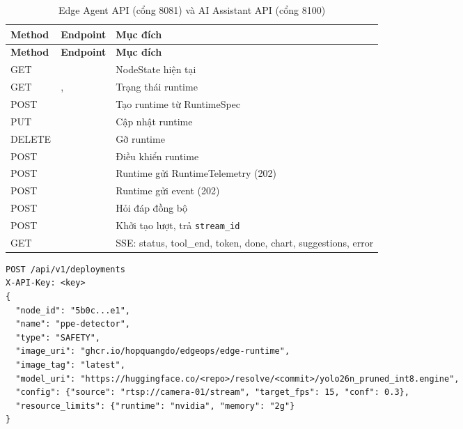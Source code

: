 \begin{longtable}{L{1.7cm}L{6.2cm}L{6.6cm}}
\caption{Edge Agent API (cổng 8081) và AI Assistant API (cổng 8100)}\label{tab:agent-api}\\
\toprule
\textbf{Method} & \textbf{Endpoint} & \textbf{Mục đích}\\
\midrule\endfirsthead
\toprule
\textbf{Method} & \textbf{Endpoint} & \textbf{Mục đích}\\
\midrule\endhead
GET &  & NodeState hiện tại\\
GET & ,  & Trạng thái runtime\\
POST &  & Tạo runtime từ RuntimeSpec\\
PUT &  & Cập nhật runtime\\
DELETE &  & Gỡ runtime\\
POST &  & Điều khiển runtime\\
POST &  & Runtime gửi RuntimeTelemetry (202)\\
POST &  & Runtime gửi event (202)\\
\midrule
POST &  & Hỏi đáp đồng bộ\\
POST &  & Khởi tạo lượt, trả \texttt{stream\_id}\\
GET &  & SSE: status, tool\_end, token, done, chart, suggestions, error\\
\bottomrule
\end{longtable}

\begin{lstlisting}[caption={Ví dụ yêu cầu tạo deployment}]
POST /api/v1/deployments
X-API-Key: <key>
{
  "node_id": "5b0c...e1",
  "name": "ppe-detector",
  "type": "SAFETY",
  "image_uri": "ghcr.io/hopquangdo/edgeops/edge-runtime",
  "image_tag": "latest",
  "model_uri": "https://huggingface.co/<repo>/resolve/<commit>/yolo26n_pruned_int8.engine",
  "config": {"source": "rtsp://camera-01/stream", "target_fps": 15, "conf": 0.3},
  "resource_limits": {"runtime": "nvidia", "memory": "2g"}
}
\end{lstlisting}
